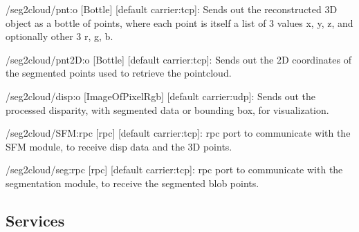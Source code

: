 \begin{DoxyItemize}
\item /seg2cloud/pnt\+:o \mbox{[}Bottle\mbox{]} \mbox{[}default carrier\+:tcp\mbox{]}\+: Sends out the reconstructed 3D object as a bottle of points, where each point is itself a list of 3 values x, y, z, and optionally other 3 r, g, b.
\item /seg2cloud/pnt2D\+:o \mbox{[}Bottle\mbox{]} \mbox{[}default carrier\+:tcp\mbox{]}\+: Sends out the 2D coordinates of the segmented points used to retrieve the pointcloud.
\item /seg2cloud/disp\+:o \mbox{[}Image\+Of\+Pixel\+Rgb\mbox{]} \mbox{[}default carrier\+:udp\mbox{]}\+: Sends out the processed disparity, with segmented data or bounding box, for visualization.
\item /seg2cloud/\+S\+FM\+:rpc \mbox{[}rpc\mbox{]} \mbox{[}default carrier\+:tcp\mbox{]}\+: rpc port to communicate with the S\+FM module, to receive disp data and the 3D points.
\item /seg2cloud/seg\+:rpc \mbox{[}rpc\mbox{]} \mbox{[}default carrier\+:tcp\mbox{]}\+: rpc port to communicate with the segmentation module, to receive the segmented blob points.
\end{DoxyItemize}\hypertarget{group__seg2cloud_services_sec}{}\subsection{Services}\label{group__seg2cloud_services_sec}
